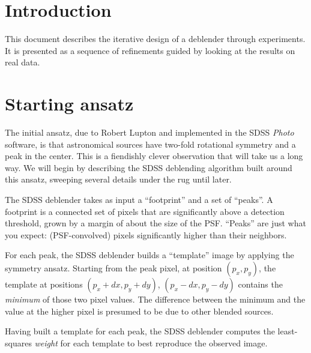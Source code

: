 \documentclass[10pt,letter]{article}
\author{Dustin Lang}
\begin{document}
\maketitle

\section{Introduction}

This document describes the iterative design of a deblender through
experiments.  It is presented as a sequence of refinements guided by
looking at the results on real data.

\section{Starting ansatz}

The initial ansatz, due to Robert Lupton \cite{rhldeblend} and
implemented in the SDSS \emph{Photo} software, is that astronomical
sources have two-fold rotational symmetry and a peak in the center.
This is a fiendishly clever observation that will take us a long way.
We will begin by describing the SDSS deblending algorithm built around
this ansatz, sweeping several details under the rug until later.

The SDSS deblender takes as input a ``footprint'' and a set of
``peaks''.  A footprint is a connected set of pixels that are
significantly above a detection threshold, grown by a margin of about
the size of the PSF.  ``Peaks'' are just what you expect:
(PSF-convolved) pixels significantly higher than their neighbors.

For each peak, the SDSS deblender builds a ``template'' image by
applying the symmetry ansatz.  Starting from the peak pixel, at
position $(p_x,p_y)$, the template at positions $(p_x + dx, p_y +
dy)$, $(p_x - dx, p_y - dy)$ contains the \emph{minimum} of those two
pixel values.  The difference between the minimum and the value at the
higher pixel is presumed to be due to other blended sources.

Having built a template for each peak, the SDSS deblender computes the
least-squares \emph{weight} for each template to best reproduce the
observed image.
\end{document}
